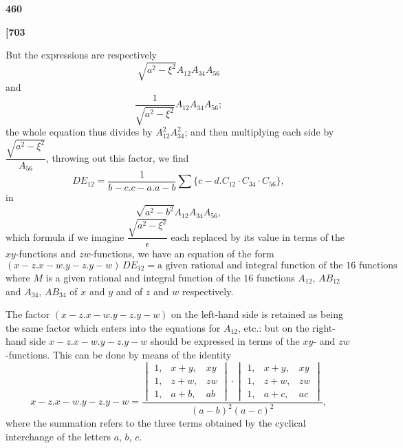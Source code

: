 \documentclass[11pt,a4paper]{book}
\begin{document}
\begin{center}
\textbf{460}
\end{center}

\vspace{0.5em}

\noindent\textbf{[703}

\vspace{0.5em}

But the expressions are respectively
\[
\sqrt{a^2 - \xi^2} A_{12} A_{34} A_{56}
\]
and
\[
\frac{1}{\sqrt{a^2 - \xi^2}} A_{12} A_{34} A_{56};
\]
the whole equation thus divides by $A_{12}^2 A_{34}^2$; and then multiplying each side by $\dfrac{\sqrt{a^2 - \xi^2}}{A_{56}}$, throwing out this factor, we find
\[
DE_{12} = \frac{1}{b - c . c - a . a - b} \sum\{c - d . C_{12} \cdot C_{34} \cdot C_{56}\},
\]
in
\[
\sqrt{a^2 - b^2} A_{12} A_{34} A_{56},
\]
which formula if we imagine $\dfrac{\sqrt{a^2 - \xi^2}}{\epsilon}$ each replaced by its value in terms of the $xy$-functions and $zw$-functions, we have an equation of the form
\[
(x - z . x - w . y - z . y - w)\, DE_{12} = \text{a given rational and integral function of the $16$ functions}
\]
where $M$ is a given rational and integral function of the $16$ functions $A_{12}$, $AB_{12}$ and $A_{34}$, $AB_{34}$ of $x$ and $y$ and of $z$ and $w$ respectively.

The factor $(x - z . x - w . y - z . y - w)$ on the left-hand side is retained as being the same factor which enters into the equations for $A_{12}$, etc.: but on the right-hand side $x - z . x - w . y - z . y - w$ should be expressed in terms of the $xy$- and $zw$-functions. This can be done by means of the identity
\[
x - z . x - w . y - z . y - w = \frac{\begin{vmatrix} 1, & x + y, & xy \\ 1, & z + w, & zw \\ 1, & a + b, & ab \end{vmatrix} \cdot \begin{vmatrix} 1, & x + y, & xy \\ 1, & z + w, & zw \\ 1, & a + c, & ac \end{vmatrix}}{(a - b)^2 (a - c)^2},
\]
where the summation refers to the three terms obtained by the cyclical interchange of the letters $a$, $b$, $c$.
\end{document}
